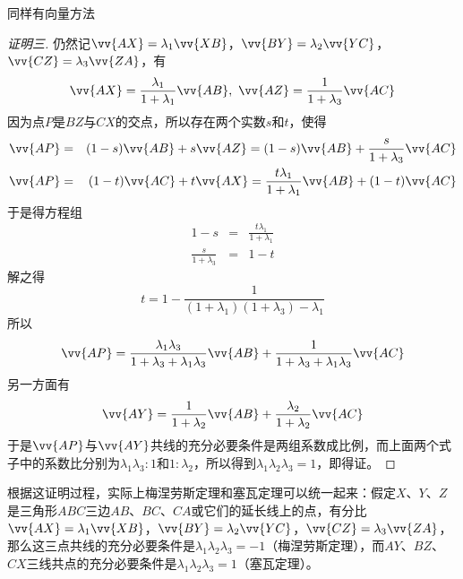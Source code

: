 同样有向量方法
\begin{proof}[证明三]
  仍然记$\vv{AX}=\lambda_1\vv{XB}$，$\vv{BY}=\lambda_2\vv{YC}$，$\vv{CZ}=\lambda_3\vv{ZA}$，有
  \begin{equation*}
    \vv{AX}=\frac{\lambda_1}{1+\lambda_{1}}\vv{AB}, \ \vv{AZ}=\frac{1}{1+\lambda_3}\vv{AC}
  \end{equation*}
  因为点$P$是$BZ$与$CX$的交点，所以存在两个实数$s$和$t$，使得
  \begin{eqnarray*}
    \vv{AP} &=& (1-s)\vv{AB}+s\vv{AZ} = (1-s)\vv{AB}+\frac{s}{1+\lambda_3}\vv{AC} \\
    \vv{AP} &=& (1-t)\vv{AC}+t\vv{AX} =  \frac{t\lambda_1}{1+\lambda_{1}}\vv{AB}+(1-t)\vv{AC}
  \end{eqnarray*}
  于是得方程组
  \begin{eqnarray}
    1-s &=&  \frac{t\lambda_1}{1+\lambda_{1}} \\
    \frac{s}{1+\lambda_3} &=& 1-t
  \end{eqnarray}
  解之得
  \begin{equation*}
    t = 1- \frac{1}{(1+\lambda_1)(1+\lambda_3)-\lambda_1}
  \end{equation*}
  所以
 \[ \vv{AP} = \frac{\lambda_1\lambda_3}{1+\lambda_3+\lambda_1\lambda_3} \vv{AB} + \frac{1}{1+\lambda_3+\lambda_1\lambda_3} \vv{AC} \]
  另一方面有
  \begin{equation*}
    \vv{AY}=\frac{1}{1+\lambda_2}\vv{AB}+\frac{\lambda_2}{1+\lambda_2}\vv{AC}
  \end{equation*}
  于是$\vv{AP}$与$\vv{AY}$共线的充分必要条件是两组系数成比例，而上面两个式子中的系数比分别为$\lambda_1\lambda_3 : 1$和$1 : \lambda_2$，所以得到$\lambda_1\lambda_2\lambda_3=1$，即得证。
\end{proof}

\begin{example}[梅涅劳斯定理与塞瓦定理的统一]
根据这证明过程，实际上梅涅劳斯定理和塞瓦定理可以统一起来：假定$X$、$Y$、$Z$是三角形$ABC$三边$AB$、$BC$、$CA$或它们的延长线上的点，有分比$\vv{AX}=\lambda_1\vv{XB}$，$\vv{BY}=\lambda_2\vv{YC}$，$\vv{CZ}=\lambda_3\vv{ZA}$，那么这三点共线的充分必要条件是$\lambda_1\lambda_2\lambda_3=-1$（梅涅劳斯定理），而$AY$、$BZ$、$CX$三线共点的充分必要条件是$\lambda_1\lambda_2\lambda_3=1$（塞瓦定理）。
\end{example}

